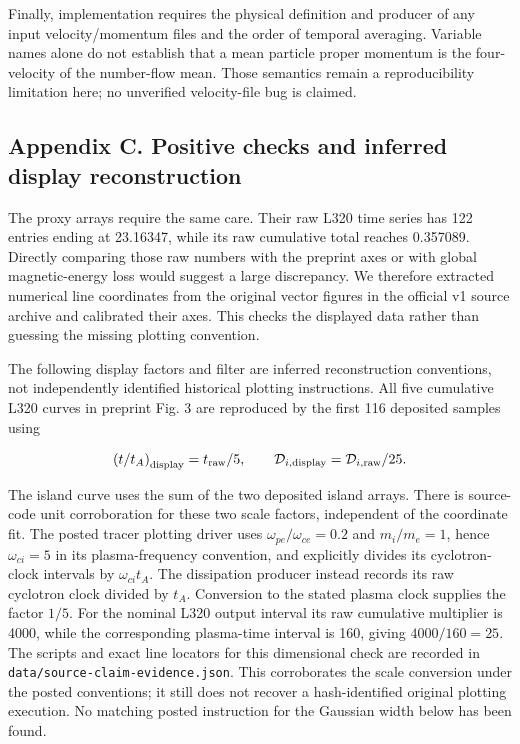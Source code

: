 Finally, implementation requires the physical definition and producer of
any input velocity/momentum files and the order of temporal averaging.
Variable names alone do not establish that a mean particle proper
momentum is the four-velocity of the number-flow mean. Those semantics
remain a reproducibility limitation here; no unverified velocity-file
bug is claimed.

\subsection{Appendix C. Positive checks and inferred display
reconstruction}\label{appendix-c.-positive-checks-and-inferred-display-reconstruction}

The proxy arrays require the same care. Their raw L320 time series has
122 entries ending at 23.16347, while its raw cumulative total reaches
0.357089. Directly comparing those raw numbers with the preprint axes or
with global magnetic-energy loss would suggest a large discrepancy. We
therefore extracted numerical line coordinates from the original vector
figures in the official v1 source archive and calibrated their axes.
This checks the displayed data rather than guessing the missing plotting
convention.

The following display factors and filter are inferred reconstruction
conventions, not independently identified historical plotting
instructions. All five cumulative L320 curves in preprint Fig. 3 are
reproduced by the first 116 deposited samples using

\[
\left(t/t_A\right)_{\rm display}
=t_{\rm raw}/5,\qquad
\mathcal D_{i,\rm display}
=\mathcal D_{i,\rm raw}/25.
\]

The island curve uses the sum of the two deposited island arrays. There
is source-code unit corroboration for these two scale factors,
independent of the coordinate fit. The posted tracer plotting driver
uses \(\omega_{pe}/\omega_{ce}=0.2\) and \(m_i/m_e=1\), hence
\(\omega_{ci}=5\) in its plasma-frequency convention, and explicitly
divides its cyclotron-clock intervals by \(\omega_{ci}t_A\). The
dissipation producer instead records its raw cyclotron clock divided by
\(t_A\). Conversion to the stated plasma clock supplies the factor
\(1/5\). For the nominal L320 output interval its raw cumulative
multiplier is 4000, while the corresponding plasma-time interval is 160,
giving \(4000/160=25\). The scripts and exact line locators for this
dimensional check are recorded in
\nolinkurl{data/source-claim-evidence.json}. This corroborates the scale
conversion under the posted conventions; it still does not recover a
hash-identified original plotting execution. No matching posted
instruction for the Gaussian width below has been found.

